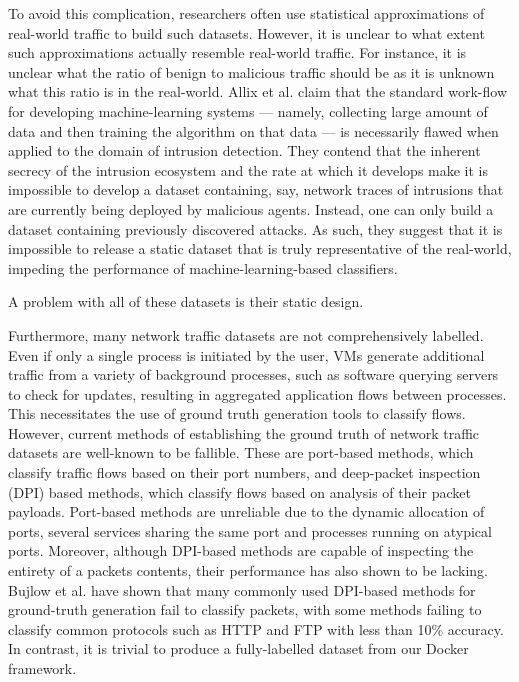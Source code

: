 \documentclass[sigconf,anonymous]{acmart}\usepackage[]{graphicx}\usepackage[]{color}
\begin{document}
To avoid this complication, researchers often use statistical approximations of real-world traffic to build such datasets. However, it is unclear to what extent such approximations actually resemble real-world traffic. For instance, it is unclear what the ratio of benign to malicious traffic should be as it is unknown what this ratio is in the real-world. Allix et al. \cite{allix2014machine} claim that the standard work-flow for developing machine-learning systems --- namely, collecting large amount of data and then training the algorithm on that data --- is necessarily flawed when applied to the domain of intrusion detection. They contend that the inherent secrecy of the intrusion ecosystem and the rate at which it develops make it is impossible to develop a dataset containing, say, network traces of intrusions that are currently being deployed by malicious agents. Instead, one can only build a dataset containing previously discovered attacks. As such, they suggest that it is impossible to release a static dataset that is truly representative of the real-world, impeding the performance of machine-learning-based classifiers.


A problem with all of these datasets is their static design. 



Furthermore, many network traffic datasets are not comprehensively labelled. Even if only a single process is initiated by the user, VMs generate additional traffic from a variety of background processes, such as software querying servers to check for updates, resulting in aggregated application flows between processes. This necessitates the use of ground truth generation tools to classify flows. However, current methods of establishing the ground truth of network traffic datasets are well-known to be fallible\cite{carela2014our}. These are port-based methods, which classify traffic flows based on their port numbers, and deep-packet inspection (DPI) based methods, which classify flows based on analysis of their packet payloads. Port-based methods are unreliable due to the dynamic allocation of ports, several services sharing the same port and processes running on atypical ports. Moreover, although DPI-based methods are capable of inspecting the entirety of a packets contents, their performance has also shown to be lacking. Bujlow et al. \cite{bujlow2013comparison} have shown that many commonly used DPI-based methods for ground-truth generation fail to classify packets, with some methods failing to classify common protocols such as HTTP and FTP with less than 10\% accuracy. In contrast, it is trivial to produce a fully-labelled dataset from our Docker framework.
\end{document}
